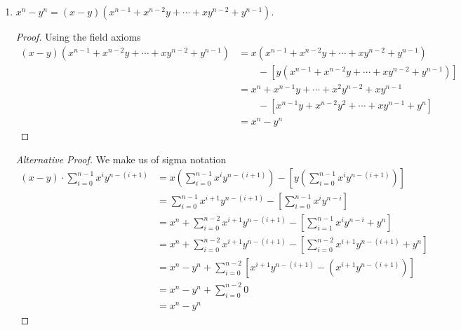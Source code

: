 \begin{exercise}[\textbf{1}]
\begin{enumerate}
\begin{proof}
             Using the field axioms
             \begin{align*}
                 (x-y)(x^2+xy+y^2) &= x^2(x-y)+xy(x-y)+y^2(x-y) \\
                 &= (x^3-x^2y)+(x^2y-xy^2)+(xy^2-y^3) \\
                 &= x^3+(x^2y-x^2y)+(xy^2-xy^2)-y^3 \\
                 &= x^3-y^3
             \end{align*}
        \end{proof}
        \item $x^n-y^n = (x-y)(x^{n-1}+x^{n-2}y+\dotsb +xy^{n-2}+y^{n-1}).$
        \begin{proof}Using the field axioms
             \begin{align*}
                 (x-y)(x^{n-1}+x^{n-2}y+\dotsb +xy^{n-2}+y^{n-1}) &= x(x^{n-1}+x^{n-2}y+\dotsb+xy^{n-2}+y^{n-1}) \\
                 & \qquad -[y(x^{n-1}+x^{n-2}y+\dotsb+xy^{n-2}+y^{n-1})] \\
                 &= x^n+x^{n-1}y+\dotsb+x^2y^{n-2}+xy^{n-1} \\
                 & \qquad -[x^{n-1}y+x^{n-2}y^2+\dotsb+xy^{n-1}+y^{n}] \\
                 &= x^n-y^n
             \end{align*}
        \end{proof}
        \begin{proof}[Alternative Proof] We make us of sigma notation
             \begin{align*}
                 (x-y)\cdot \sum_{i=0}^{n-1}x^iy^{n-(i+1)} &= x\left(\sum_{i=0}^{n-1}x^iy^{n-(i+1)}\right)- \left[y\left(\sum_{i=0}^{n-1}x^iy^{n-(i+1)}\right)\right] \\
                 &= \sum_{i=0}^{n-1}x^{i+1}y^{n-(i+1)} -\left[\sum_{i=0}^{n-1}x^iy^{n-i}\right] \\
                 &= x^n +\sum_{i=0}^{n-2}x^{i+1}y^{n-(i+1)} -\left[\sum_{i=1}^{n-1}x^iy^{n-i} +y^n\right] \\
                 &= x^n +\sum_{i=0}^{n-2}x^{i+1}y^{n-(i+1)} -\left[\sum_{i=0}^{n-2}x^{i+1}y^{n-(i+1)} +y^n\right] \\
                 &= x^n-y^n + \sum_{i=0}^{n-2} \left[x^{i+1}y^{n-(i+1)} - (x^{i+1}y^{n-(i+1)}) \right] \\
                 &= x^n-y^n +\sum_{i=0}^{n-2} 0 \\
                 &= x^n-y^n
             \end{align*}

\end{proof}
\end{enumerate}
\end{exercise}
